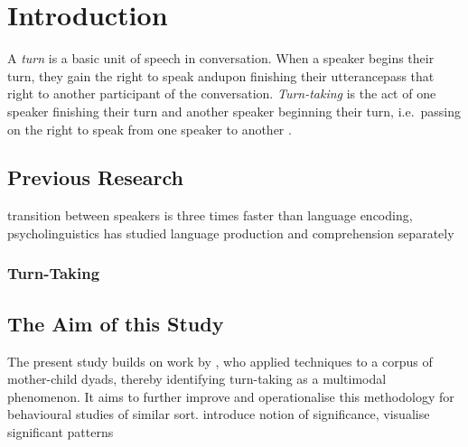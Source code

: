 
\chapter{Introduction}
A \emph{turn} is a basic unit of speech in conversation. When a speaker begins their turn, they gain the right to speak and\dash upon finishing their utterance\dash pass that right to another participant of the conversation. \emph{Turn-taking} is the act of one speaker finishing their turn and another speaker beginning their turn, i.e.\ passing on the right to speak from one speaker to another \cite[]{levinson16}.

\section{Previous Research}
\cite{levinson16} transition between speakers is three times faster than language encoding, psycholinguistics has studied language production and comprehension separately

\subsection{Turn-Taking}
\cite{stivers09}

\subsection{\fpm}



\section{The Aim of this Study}
The present study builds on work by , who applied \fpm{} techniques to a corpus of mother-child dyads, thereby identifying turn-taking as a multimodal phenomenon. It aims to further improve and operationalise this methodology for behavioural studies of similar sort.
introduce notion of significance, visualise significant patterns


























